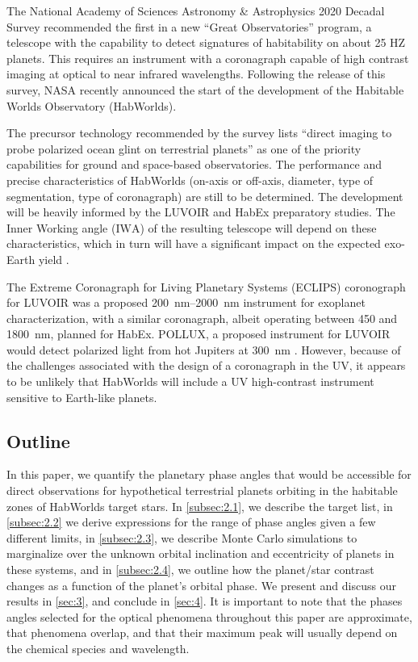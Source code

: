 \documentclass[
    usenatbib,
]{mnras}
\newcommand{\IWA}{\ensuremath{\mathrm{IWA}}}
\newcommand{\hwo}{HabWorlds}
\begin{document}
The National Academy of Sciences Astronomy \& Astrophysics 2020 Decadal Survey \citep{decadal} recommended the first in a new \enquote{Great Observatories} program, a telescope with the capability to detect signatures of habitability on about 25 HZ planets.
%
This requires an instrument with a coronagraph capable of high contrast imaging at optical to near infrared wavelengths.
%
Following the release of this survey, NASA recently announced the start of the development of the Habitable Worlds Observatory (\hwo).
%

The precursor technology recommended by the survey lists \enquote{direct imaging to probe polarized ocean glint on terrestrial planets} as one of the priority capabilities \citep[Box E.1 in][]{decadal} for ground and space-based observatories.
%
The performance and precise characteristics of \hwo{} (on-axis or off-axis, diameter, type of segmentation, type of coronagraph) are still to be determined.
%
The development will be heavily informed by the LUVOIR \citep{LUVOIR2019} and HabEx \citep{HabEx_2020} preparatory studies.
%
The Inner Working angle (\IWA{}) of the resulting telescope will depend on these characteristics, which in turn will have a significant impact on the expected exo-Earth yield \citep{Stark2019_exoplanetyield}.

The Extreme Coronagraph for Living Planetary Systems (ECLIPS) coronograph for LUVOIR was a proposed \qtyrange{200}{2000}{\nano\meter} instrument for exoplanet characterization, with a similar coronagraph, albeit operating between \num{450} and \qty{1800}{\nano\meter}, planned for HabEx.
%
POLLUX, a proposed instrument for LUVOIR would detect polarized light from hot Jupiters at \qty{300}{\nano\meter} \citep{Bouret2018_pollux}.
%
However, because of the challenges associated with the design of a coronagraph in the UV, it appears to be unlikely that \hwo{} will include a UV high-contrast instrument sensitive to Earth-like planets.


\subsection{Outline}

In this paper, we quantify the planetary phase angles that would be accessible for direct observations for hypothetical terrestrial planets orbiting in the habitable zones of \hwo{} target stars.
%
In \cref{subsec:2.1}, we describe the target list, in \cref{subsec:2.2} we derive expressions for the range of phase angles given a few different limits, in \cref{subsec:2.3}, we describe Monte Carlo simulations to marginalize over the unknown orbital inclination and eccentricity of planets in these systems, and in \cref{subsec:2.4}, we outline how the planet/star contrast changes as a function of the planet's orbital phase.  
%
We present and discuss our results in \cref{sec:3}, and conclude in \cref{sec:4}. 
It is important to note that the phases angles selected for the optical phenomena throughout this paper are approximate, that phenomena overlap, and that their maximum peak will usually depend on the chemical species and wavelength.
\end{document}
